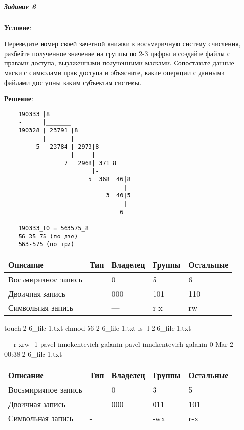 \subparagraph{Задание 6} \textbf{Условие}:

Переведите номер своей зачетной книжки в восьмеричную систему счисления, разбейте полученное значение на группы по 2-3 цифры и создайте файлы с правами доступа, выраженными полученными масками. 
Сопоставьте данные маски с символами прав доступа и объясните, какие операции с данными файлами доступны каким субъектам системы.

\textbf{Решение}:

\begin{verbatim}
    190333 |8
    -      |_______
    190328 | 23791 |8
    _______|-      |______
         5   23784 | 2973|8
              _____|-    |_____
                 7   2968| 371|8
                     ____|-   |____
                        5  368| 46|8
                           ___|-  |_
                             3  40|5
                                __|
                                 6

    190333_10 = 563575_8
    56-35-75 (по две)
    563-575 (по три)
\end{verbatim}

\newpage

\begin{table}[h!]
    \centering
    \begin{tabular}{ | l | l | l | l | l | }
        \hline
        Описание            & Тип   & Владелец  & Группы    & Остальные \\ \hline
        \hline
        Восьмиричное запись & 	    & 0	        & 5 	    & 6         \\ \hline
        Двоичная запись     & 	    & 000 	    & 101 	    & 110       \\ \hline
        Символьная запись 	& -     & --- 	    & r-x 	    & rw-       \\ \hline
    \end{tabular}
\end{table}

\begin{BashBox}
    touch 2-6_file-1.txt
    chmod 56 2-6_file-1.txt
    ls -l 2-6_file-1.txt
\end{BashBox}

\begin{OutBox}
    ----r-xrw- 1 pavel-innokentevich-galanin pavel-innokentevich-galanin 0 Mar  2 00:38 2-6_file-1.txt
\end{OutBox}

\begin{table}[h!]
    \centering
    \begin{tabular}{ | l | l | l | l | l | }
        \hline
        Описание            & Тип   & Владелец  & Группы    & Остальные \\ \hline
        \hline
        Восьмиричное запись & 	    & 0	        & 3 	    & 5         \\ \hline
        Двоичная запись     & 	    & 000 	    & 011 	    & 101       \\ \hline
        Символьная запись 	& -     & --- 	    & -wx 	    & r-x       \\ \hline
    \end{tabular}
\end{table}

